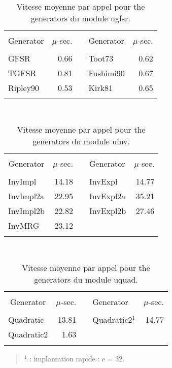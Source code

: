 \begin{table}[htb] \centering \tt
\caption {\rm Vitesse moyenne par appel pour the generators 
              du module ugfsr.}
\label {vitesse4}
\begin{tabular}{|l|r|c|l|r|}
\hline
&&&&\\
\multicolumn{1}{|c|}{\rm Generator} & $\mu$-sec. && {\rm Generator}
   & $\mu$-sec.\\
\hline \hline
&&&&\\
 GFSR                 &   0.66 && Toot73       &   0.62\\
 TGFSR                &   0.81 && Fushimi90    &   0.67\\
 Ripley90             &   0.53 && Kirk81       &   0.65\\
&&&&\\
\hline
\end{tabular}

\end {table}

\begin{table}[htb] \centering \tt
\caption {\rm Vitesse moyenne par appel pour the generators 
              du module uinv.}
\label {vitesse5}
\begin{tabular}{|l|r|c|l|r|}
\hline
&&&&\\
\multicolumn{1}{|c|}{\rm Generator} & $\mu$-sec. && {\rm Generator}
   & $\mu$-sec.\\
\hline \hline
&&&&\\
 InvImpl              &  14.18 && InvExpl      &  14.77\\
 InvImpl2a            &  22.95 && InvExpl2a    &  35.21\\
 InvImpl2b            &  22.82 && InvExpl2b    &  27.46\\
 InvMRG               &  23.12 &&              &       \\
&&&&\\
\hline
\end{tabular}

\end {table}

\begin{table}[htb] \centering \tt
\caption {\rm Vitesse moyenne par appel pour the generators 
              du module uquad.}
\label {vitesse6}
\begin{tabular}{|l|r|c|l|r|}
\hline
&&&&\\
\multicolumn{1}{|c|}{\rm Generator} & $\mu$-sec. && {\rm Generator}
   & $\mu$-sec.\\
\hline \hline
&&&&\\
 Quadratic            &  13.81 && Quadratic2$^1$&  14.77\\
 Quadratic2           &   1.63 &&               &       \\
&&&&\\
\hline
\end{tabular}

\begin {verse}
$^1$ : implantation rapide : e = 32.\\
\end {verse}
\end {table}

